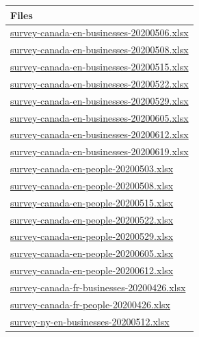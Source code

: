\documentclass[
]{article}
\begin{document}
\begin{longtable}[]{@{}l@{}}
\toprule
Files \\
\midrule
\endhead
\href{final/survey-canada-en-businesses-20200506.xlsx}{survey-canada-en-businesses-20200506.xlsx} \\
\href{final/survey-canada-en-businesses-20200508.xlsx}{survey-canada-en-businesses-20200508.xlsx} \\
\href{final/survey-canada-en-businesses-20200515.xlsx}{survey-canada-en-businesses-20200515.xlsx} \\
\href{final/survey-canada-en-businesses-20200522.xlsx}{survey-canada-en-businesses-20200522.xlsx} \\
\href{final/survey-canada-en-businesses-20200529.xlsx}{survey-canada-en-businesses-20200529.xlsx} \\
\href{final/survey-canada-en-businesses-20200605.xlsx}{survey-canada-en-businesses-20200605.xlsx} \\
\href{final/survey-canada-en-businesses-20200612.xlsx}{survey-canada-en-businesses-20200612.xlsx} \\
\href{final/survey-canada-en-businesses-20200619.xlsx}{survey-canada-en-businesses-20200619.xlsx} \\
\href{final/survey-canada-en-people-20200503.xlsx}{survey-canada-en-people-20200503.xlsx} \\
\href{final/survey-canada-en-people-20200508.xlsx}{survey-canada-en-people-20200508.xlsx} \\
\href{final/survey-canada-en-people-20200515.xlsx}{survey-canada-en-people-20200515.xlsx} \\
\href{final/survey-canada-en-people-20200522.xlsx}{survey-canada-en-people-20200522.xlsx} \\
\href{final/survey-canada-en-people-20200529.xlsx}{survey-canada-en-people-20200529.xlsx} \\
\href{final/survey-canada-en-people-20200605.xlsx}{survey-canada-en-people-20200605.xlsx} \\
\href{final/survey-canada-en-people-20200612.xlsx}{survey-canada-en-people-20200612.xlsx} \\
\href{final/survey-canada-fr-businesses-20200426.xlsx}{survey-canada-fr-businesses-20200426.xlsx} \\
\href{final/survey-canada-fr-people-20200426.xlsx}{survey-canada-fr-people-20200426.xlsx} \\
\href{final/survey-ny-en-businesses-20200512.xlsx}{survey-ny-en-businesses-20200512.xlsx} \\

\end{longtable}
\end{document}
